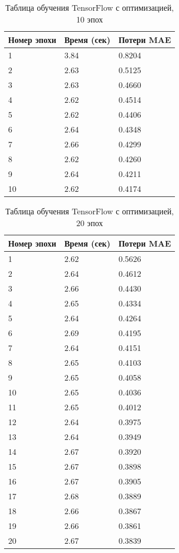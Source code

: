 \documentclass[a4paper,12pt,titlepage,final]{article}
\begin{document}
\begin{table}[H]
\centering
\begin{tabular}{|p{5.4cm}|p{3.8cm}|p{3.8cm}|}
\hline
Номер эпохи & Время (сек) & Потери MAE \\
\hline
1 & 3.84 & 0.8204 \\ [1.5ex]
\hline
2 & 2.63 & 0.5125 \\ [1.5ex]
\hline
3 & 2.63 & 0.4660 \\ [1.5ex]
\hline
4 & 2.62 & 0.4514 \\ [1.5ex]
\hline
5 & 2.62 & 0.4406 \\ [1.5ex]
\hline
6 & 2.64 & 0.4348 \\ [1.5ex]
\hline
7 & 2.66 & 0.4299 \\ [1.5ex]
\hline
8 & 2.62 & 0.4260 \\ [1.5ex]
\hline
9 & 2.64 & 0.4211 \\ [1.5ex]
\hline
10 & 2.62 & 0.4174 \\ [1.5ex]
\hline
\end{tabular}
\caption{Таблица обучения TensorFlow с оптимизацией, 10 эпох}
\label{gputable4}
\end{table}

\begin{table}[H]
\centering
\begin{tabular}{|p{6.4cm}|p{3.2cm}|p{3.2cm}|}
\hline
Номер эпохи & Время (сек) & Потери MAE\\
\hline
1 & 2.62 & 0.5626 \\ [1.5ex]
\hline
2 & 2.64 & 0.4612 \\ [1.5ex]
\hline
3 & 2.66 & 0.4430 \\ [1.5ex]
\hline
4 & 2.65 & 0.4334 \\ [1.5ex]
\hline
5 & 2.64 & 0.4264 \\ [1.5ex]
\hline
6 & 2.69 & 0.4195 \\ [1.5ex]
\hline
7 & 2.64 & 0.4151 \\ [1.5ex]
\hline
8 & 2.65 & 0.4103 \\ [1.5ex]
\hline
9 & 2.65 & 0.4058 \\ [1.5ex]
\hline
10 & 2.65 & 0.4036 \\ [1.5ex]
\hline
11 & 2.65 & 0.4012 \\ [1.5ex]
\hline
12 & 2.64 & 0.3975 \\ [1.5ex]
\hline
13 & 2.64 & 0.3949 \\ [1.5ex]
\hline
14 & 2.67 & 0.3920 \\ [1.5ex]
\hline
15 & 2.67 & 0.3898 \\ [1.5ex]
\hline
16 & 2.67 & 0.3905 \\ [1.5ex]
\hline
17 & 2.68 & 0.3889 \\ [1.5ex]
\hline
18 & 2.66 & 0.3867 \\ [1.5ex]
\hline
19 & 2.66 & 0.3861 \\ [1.5ex]
\hline
20 & 2.67 & 0.3839 \\ [1.5ex]
\hline
\end{tabular}
\caption{Таблица обучения TensorFlow с оптимизацией, 20 эпох}
\label{gputable5}
\end{table}
\end{document}
